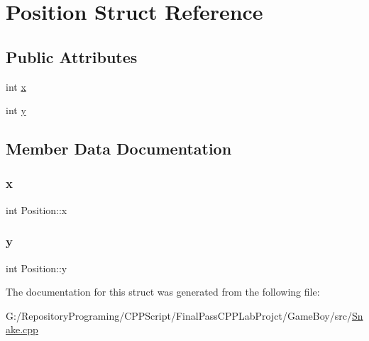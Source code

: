 \hypertarget{struct_position}{}\section{Position Struct Reference}
\label{struct_position}
\subsection*{Public Attributes}
\begin{DoxyCompactItemize}
\item 
int \mbox{\hyperlink{struct_position_aeda152ffeee17ae5be9c02327b2408d8}{x}}
\item 
int \mbox{\hyperlink{struct_position_a3c08e9213d4726b21caba3073192c4a3}{y}}
\end{DoxyCompactItemize}


\subsection{Member Data Documentation}
\mbox{\label{struct_position_aeda152ffeee17ae5be9c02327b2408d8}} 
\subsubsection{\texorpdfstring{x}{x}}
{\footnotesize\ttfamily int Position\+::x}

\mbox{\label{struct_position_a3c08e9213d4726b21caba3073192c4a3}} 
\subsubsection{\texorpdfstring{y}{y}}
{\footnotesize\ttfamily int Position\+::y}



The documentation for this struct was generated from the following file\+:\begin{DoxyCompactItemize}
\item 
G\+:/\+Repository\+Programing/\+C\+P\+P\+Script/\+Final\+Pass\+C\+P\+P\+Lab\+Projct/\+Game\+Boy/src/\mbox{\hyperlink{_snake_8cpp}{Snake.\+cpp}}\end{DoxyCompactItemize}
